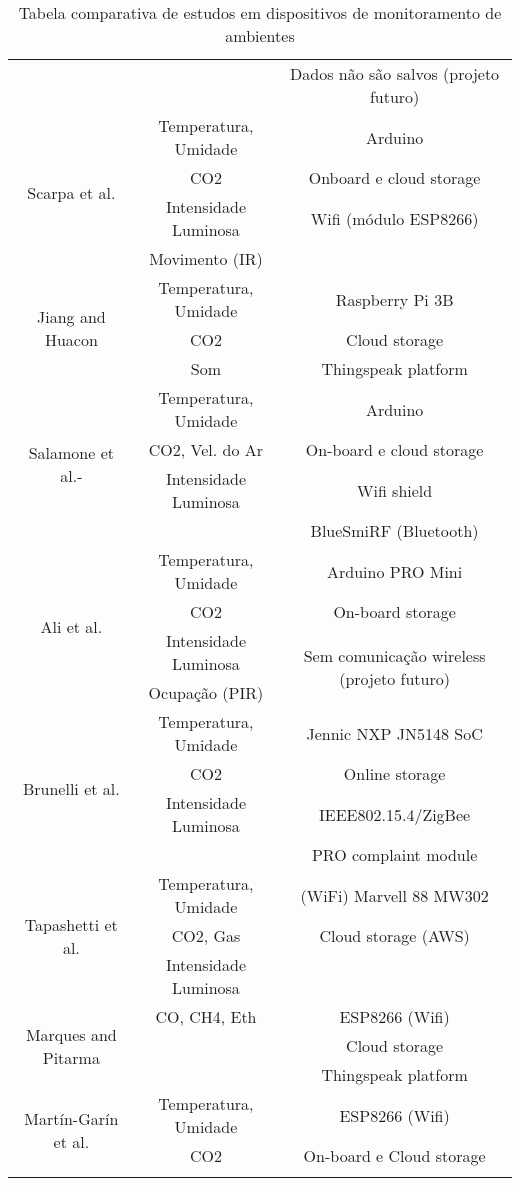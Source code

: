\documentclass[../monografia.tex]{subfiles}
\begin{document}
\begin{center}
\begin{longtable}{ |c|c|c| }
&  & \multirow{2}{12em}{Dados não são salvos (projeto futuro)} \\ 
& & \\
\hline %
\multirow{4}{8em}{Scarpa et al.\cite{SCARPA2017282}} & Temperatura, Umidade & Arduino \\ 
& CO2 & Onboard e cloud storage \\ 
& Intensidade Luminosa & Wifi (módulo ESP8266) \\ 
& Movimento (IR)  &\\
\hline %
\multirow{3}{8em}{Jiang and Huacon\cite{Jiang2017}} & Temperatura, Umidade & Raspberry Pi 3B \\ 
& CO2 & Cloud storage \\ 
& Som & Thingspeak platform \\ 
\hline %
\multirow{4}{8em}{Salamone et al.\cite{SALAMONE2017351}-\cite{Salamone2017}} & Temperatura, Umidade & Arduino \\ 
& CO2, Vel. do Ar & On-board e cloud storage \\ 
& Intensidade Luminosa & Wifi shield \\ 
&  & BlueSmiRF (Bluetooth) \\ 
\hline %
\multirow{4}{8em}{Ali et al.\cite{ALI2016114}} & Temperatura, Umidade & Arduino PRO Mini \\
& CO2 & On-board storage \\ 
& Intensidade Luminosa & \multirow{2}{12em}{Sem comunicação wireless (projeto futuro)} \\ 
& Ocupação (PIR) &  \\ 
\hline %
\multirow{4}{8em}{Brunelli et al.\cite{Brunelli2014}} & Temperatura, Umidade & Jennic NXP JN5148 %
SoC \\
& CO2 & Online storage \\ 
& Intensidade Luminosa & IEEE802.15.4/ZigBee \\ 
&  & PRO complaint module \\ 
\hline %
\multirow{3}{8em}{Tapashetti et al.\cite{Tapashetti2016}} & Temperatura, Umidade & (WiFi) Marvell 88 MW302 \\
& CO2, Gas & Cloud storage (AWS) \\ 
& Intensidade Luminosa &  \\ %
\hline %
\multirow{3}{8em}{Marques and Pitarma\cite{Marques2019}} & CO, CH4, Eth & ESP8266 (Wifi)\\
&  & Cloud storage \\ 
&  & Thingspeak platform \\ 
\hline %
\multirow{2}{8em}{Martín-Garín et al.\cite{MARTINGARIN2018201}} & Temperatura, Umidade & ESP8266 (Wifi)\\
& CO2 & On-board e Cloud storage \\ 
\hline 
\caption{Tabela comparativa de estudos em dispositivos de monitoramento de ambientes}
\label{table}
\end{longtable}
\end{center}
\end{document}
